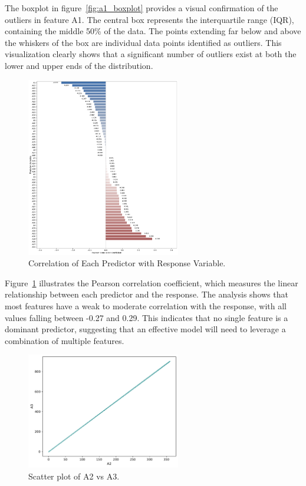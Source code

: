 \documentclass[11pt]{report}
\begin{document}
The boxplot in figure~\ref{fig:a1_boxplot} provides a visual confirmation of the outliers in feature A1. The central box represents the interquartile range (IQR), containing the middle 50\% of the data. The points extending far below and above the whiskers of the box are individual data points identified as outliers. This visualization clearly shows that a significant number of outliers exist at both the lower and upper ends of the distribution.

\begin{figure}[H]
    \centering
    \includegraphics[width=0.6\textwidth]{images/correlation_with_T.pdf}
    \caption{Correlation of Each Predictor with Response Variable.}
    \label{fig:correlation_with_T}
\end{figure}

Figure~\ref{fig:correlation_with_T} illustrates the Pearson correlation coefficient, which measures the linear relationship between each predictor and the response. The analysis shows that most features have a weak to moderate correlation with the response, with all values falling between -0.27 and 0.29. This indicates that no single feature is a dominant predictor, suggesting that an effective model will need to leverage a combination of multiple features.

\begin{figure}[H]
    \centering
    \includegraphics[width=0.6\textwidth]{images/A2_vs_A3_scatterplot.pdf}
    \caption{Scatter plot of A2 vs A3.}
    \label{fig:A2_vs_A3_scatterplot}
\end{figure}
\end{document}
